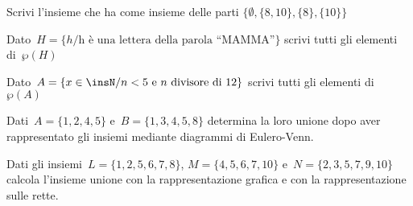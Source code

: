 \begin{esercizio}
 \label{ese:7.4}
 Scrivi l'insieme che ha come insieme delle parti
$\{\emptyset,\{8,10\},\{8\},\{10\}\}$
\end{esercizio}

\begin{esercizio}
 \label{ese:7.5}
Dato~$H=\{h/\text{h è una lettera della parola ``MAMMA''}\}$ scrivi
tutti gli elementi di~$\wp (H)$
\end{esercizio}

\begin{esercizio}
 \label{ese:7.6}
 Dato~$A=\{x\in\insN/ n<5\text{ e }n\text{ divisore di~12}\}$ scrivi tutti gli 
elementi di
$\wp (A)$
\end{esercizio}


\begin{esercizio}
 \label{ese:7.7}
Dati~$A=\{1,2,4,5\}$ e~$B=\{1,3,4,5,8\}$ determina la loro unione dopo
aver rappresentato gli insiemi mediante diagrammi di Eulero-Venn.
 \end{esercizio}

\begin{esercizio}
 \label{ese:7.8}
 Dati gli insiemi~$L=\{1,2,5,6,7,8\}$, $M=\{4,5,6,7,10\}$ e~$N=\{2,3,5,7,9,10\}$
calcola l'insieme unione con la rappresentazione grafica e con la 
rappresentazione sulle rette.
%  
\end{esercizio}

